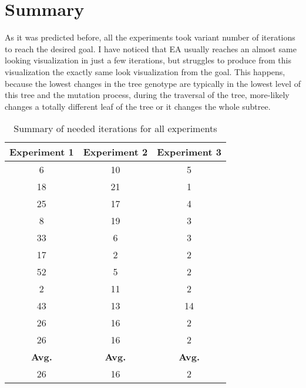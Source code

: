 \section{Summary}
As it was predicted before, all the experiments took variant number of iterations to reach the desired goal. I have noticed that EA usually reaches an almost same looking visualization in just a few iterations, but struggles to produce from this visualization the exactly same look visualization from the goal. This happens, because the lowest changes in the tree genotype are typically in the lowest level of this tree and the mutation process, during the traversal of the tree, more-likely changes a totally different leaf of the tree or it changes the whole subtree.
\begin{table}[htbp]
      \centering
      \caption{Summary of needed iterations for all experiments}
      \label{table:results}
          \begin{tabular}{ c | c | c }
          \hline
              \textbf{Experiment 1} & \textbf{Experiment 2} & \textbf{Experiment 3} \\
          \toprule
\hline 6 & 10 & 5 \\
\hline 18 & 21 & 1 \\
\hline 25 & 17 & 4 \\
\hline 8 & 19 & 3 \\
\hline 33 & 6 & 3 \\
\hline 17 & 2 & 2 \\
\hline 52 & 5 & 2 \\
\hline 2 & 11 & 2 \\
\hline 43 & 13 & 14 \\
\hline 26 & 16 & 2 \\
\hline 26 & 16 & 2 \\
\hline \textbf{Avg.} & \textbf{Avg.} & \textbf{Avg.} \\
\hline 26 & 16 & 2 \\
          \end{tabular}
\end{table}
